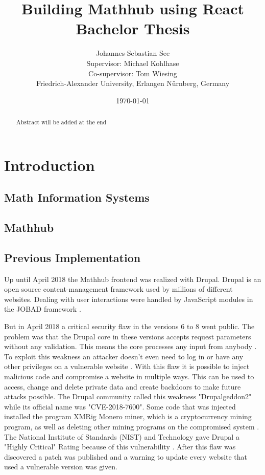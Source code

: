 \documentclass[11pt,a4paper]{article}
\title{Building Mathhub using React\\ \vspace{2 mm} Bachelor Thesis}
\author{Johannes-Sebastian See\\Supervisor: Michael Kohlhase\\Co-supervisor: Tom Wiesing\\Friedrich-Alexander University, Erlangen Nürnberg, Germany}
\date{\today}
\begin{document}
\begin{titlepage}
\maketitle
\begin{abstract}
Abstract will be added at the end
\end{abstract}

\end{titlepage}

\tableofcontents
\section{Introduction}
\subsection{Math Information Systems}
\subsection{Mathhub}
\subsection{Previous Implementation}
Up until April 2018 the Mathhub frontend was realized with Drupal.
Drupal is an open source content-management framework used by millions of different websites.
Dealing with user interactions were handled by JavaScript modules in the JOBAD framework \cite{comp}.
	
But in April 2018 a critical security flaw in the versions 6 to 8 went public.
The problem was that the Drupal core in these versions accepts request parameters without any validation.
This means the core processes any input from anybody \cite{zdnet}.
To exploit this weakness an attacker doesn't even need to log in or have any other privileges on a vulnerable website \cite{register}.
With this flaw it is possible to inject malicious code and compromise a website in multiple ways.
This can be used to access, change and delete private data and create backdoors to make future attacks possible.
The Drupal community called this weakness "Drupalgeddon2" while its official name was "CVE-2018-7600".
Some code that was injected installed the program XMRig Monero miner, which is a cryptocurrency mining program, as well as deleting other mining programs on the compromised system \cite{hacker}.
The National Institute of Standards (NIST) and Technology gave Drupal a "Highly Critical" Rating because of this vulnerability \cite{nist}.
 After this flaw was discovered a patch was published and a warning to update every website that used a vulnerable version was given.
	
\end{document}
